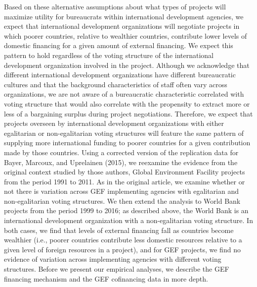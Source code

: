 \documentclass{article}
\begin{document}
Based on these alternative assumptions about what types of projects will maximize utility for bureaucrats within international development agencies, we expect that international development organizations will negotiate projects in which poorer countries, relative to wealthier countries, contribute lower levels of domestic financing for a given amount of external financing.  We expect this pattern to hold regardless of the voting structure of the international development organization involved in the project.  Although we acknowledge that different international development organizations have different bureaucratic cultures and that the background characteristics of staff often vary across organizations, we are not aware of a bureaucratic characteristic correlated with voting structure that would also correlate with the propensity to extract more or less of a bargaining surplus during project negotiations.  Therefore, we expect that projects overseen by international development organizations with either egalitarian or non-egalitarian voting structures will feature the same pattern of supplying more international funding to poorer countries for a given contribution made by those countries.
Using a corrected version of the replication data for Bayer, Marcoux, and Uprelainen (2015), we reexamine the evidence from the original context studied by those authors, Global Environment Facility projects from the period 1991 to 2011.  As in the original article, we examine whether or not there is variation across GEF implementing agencies with egalitarian and non-egalitarian voting structures.  We then extend the analysis to World Bank projects from the period 1999 to 2016; as described above, the World Bank is an international development organization with a non-egalitarian voting structure.  In both cases, we find that levels of external financing fall as countries become wealthier (i.e., poorer countries contribute less domestic resources relative to a given level of foreign resources in a project), and for GEF projects, we find no evidence of variation across implementing agencies with different voting structures.  Before we present our empirical analyses, we describe the GEF financing mechanism and the GEF cofinancing data in more depth.
\end{document}
